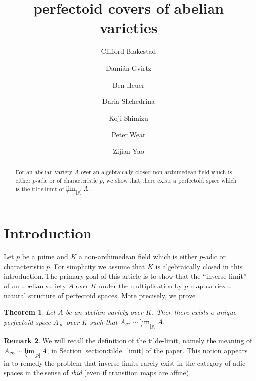 \documentclass[10pt,oneside]{amsart}
\title[perfectoid covers of abelian varieties]{perfectoid  covers of abelian varieties}
\author{
	Clifford Blakestad \and
	Dami\'an Gvirtz \and
	Ben Heuer \and 
	Daria Shchedrina \and
	Koji Shimizu \and 
	Peter Wear \and
	Zijian Yao}
\newtheorem{mainthm}{Theorem}
\theoremstyle{definition}
\newtheorem{remark*}[mainthm]{Remark}
\begin{document}
	
	\maketitle
	
	\begin{abstract}
For an abelian variety $A$ over an algebraically closed non-archimedean field which is either $p$-adic or of characteristic $p$, we show that there exists a perfectoid space which is the tilde limit of $\varprojlim_{[p]}A$.
	\end{abstract}
	

	
	
 \tableofcontents
 	
	

	\section{Introduction} 

Let $p$ be a prime and $K$ a non-archimedean field which is either $p$-adic or characteristic $p$. For simplicity we assume that $K$ is  algebraically closed in this introduction. The primary goal of this article is to show that the ``inverse limit'' of an abelian variety $A$ over $K$ under the multiplication by $p$ map carries a natural structure of perfectoid spaces. %
More precisely, we prove 

         \begin{mainthm} \label{thm:main_thm_intro}
		Let $A$ be an abelian variety over $K$. Then there exists a unique perfectoid space $A_\infty$ over $K$ such that
				$A_\infty \sim \varprojlim_{[p]} A.$
	\end{mainthm}
	
\begin{remark*}	 \label{remark:inverse_limit_adic}
We will recall the definition of the tilde-limit, namely the meaning of $A_\infty \sim \varprojlim_{[p]} A$, in Section \ref{section:tilde_limit} of the paper. This notion appears in \cite{SW} to remedy the problem that inverse limits rarely exist in the category of adic spaces in the sense of \textit{\small ibid} (even if transition maps are affine). 
\end{remark*}
\end{document}
